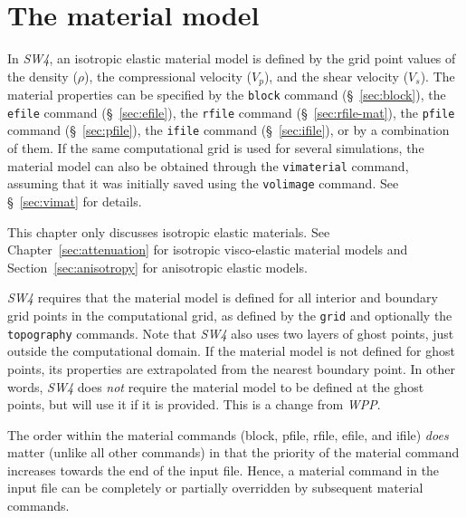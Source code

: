 \documentclass[11pt]{report}
\begin{document}
\chapter{The material model} \label{sec:material}

In \emph{SW4}, an isotropic elastic material model is defined by the grid point values of the density
($\rho$), the compressional velocity ($V_p$), and the shear velocity ($V_s$). The material
properties can be specified by the \verb+block+ command (\S~\ref{sec:block}), the \verb+efile+
command (\S~\ref{sec:efile}), the \verb+rfile+ command (\S~\ref{sec:rfile-mat}), the \verb+pfile+
command (\S~\ref{sec:pfile}), the \verb+ifile+ command (\S~\ref{sec:ifile}), or by a combination of
them. If the same computational grid is used for several simulations, the material model can also be
obtained through the \verb+vimaterial+ command, assuming that it was initially saved using the
\verb+volimage+ command. See \S~\ref{sec:vimat} for details.

This chapter only discusses isotropic elastic materials. See Chapter~\ref{sec:attenuation} for
isotropic visco-elastic material models and Section~\ref{sec:anisotropy} for anisotropic elastic
models.

\emph{SW4} requires that the material model is defined for all interior and boundary grid points in
the computational grid, as defined by the {\tt grid} and optionally the {\tt topography}
commands. Note that \emph{SW4} also uses two layers of ghost points, just outside the computational
domain. If the material model is not defined for ghost points, its properties are extrapolated from
the nearest boundary point. In other words, \emph{SW4} does {\em not} require the material model to
be defined at the ghost points, but will use it if it is provided. This is a change from
\emph{WPP}.

The order within the material commands (block, pfile, rfile, efile, and ifile) {\em does} matter (unlike
all other commands) in that the priority of the material command increases towards the end of the
input file. Hence, a material command in the input file can be completely or partially overridden by
subsequent material commands.
\end{document}
